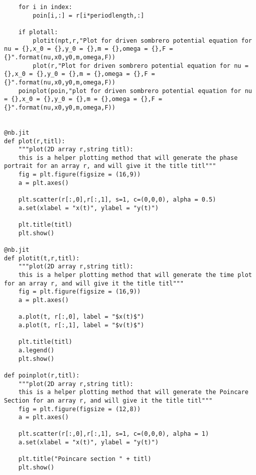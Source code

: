\documentclass[aps,pra,notitlepage,amsmath,amssymb,letterpaper,12pt]{revtex4-1}
\theoremstyle{definition}
\begin{document}
\begin{lstlisting}
    for i in index:
        poin[i,:] = r[i*periodlength,:]
    
    if plotall:
        plotit(npt,r,"Plot for driven sombrero potential equation for nu = {},x_0 = {},y_0 = {},m = {},omega = {},F = {}".format(nu,x0,y0,m,omega,F))
        plot(r,"Plot for driven sombrero potential equation for nu = {},x_0 = {},y_0 = {},m = {},omega = {},F = {}".format(nu,x0,y0,m,omega,F))
    poinplot(poin,"plot for driven sombrero potential equation for nu = {},x_0 = {},y_0 = {},m = {},omega = {},F = {}".format(nu,x0,y0,m,omega,F))

    
@nb.jit
def plot(r,titl):
    """plot(2D array r,string titl):
    this is a helper plotting method that will generate the phase portrait for an array r, and will give it the title titl"""
    fig = plt.figure(figsize = (16,9))
    a = plt.axes()
    
    plt.scatter(r[:,0],r[:,1], s=1, c=(0,0,0), alpha = 0.5)
    a.set(xlabel = "x(t)", ylabel = "y(t)")
    
    plt.title(titl)
    plt.show()
    
@nb.jit
def plotit(t,r,titl):
    """plot(2D array r,string titl):
    this is a helper plotting method that will generate the time plot for an array r, and will give it the title titl"""
    fig = plt.figure(figsize = (16,9))
    a = plt.axes()
 
    a.plot(t, r[:,0], label = "$x(t)$")
    a.plot(t, r[:,1], label = "$v(t)$")
    
    plt.title(titl)
    a.legend()
    plt.show()
    
def poinplot(r,titl):
    """plot(2D array r,string titl):
    this is a helper plotting method that will generate the Poincare Section for an array r, and will give it the title titl"""
    fig = plt.figure(figsize = (12,8))
    a = plt.axes()
    
    plt.scatter(r[:,0],r[:,1], s=1, c=(0,0,0), alpha = 1)
    a.set(xlabel = "x(t)", ylabel = "y(t)")
    
    plt.title("Poincare section " + titl)
    plt.show()

\end{lstlisting}
\end{document}
